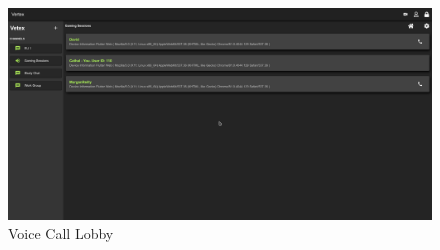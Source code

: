\begin{figure}[h!]
    \caption{Voice Call Lobby}
    \label{image:voiceCallLobby}
    \centering
    \includegraphics[width=1.0\textwidth]{images/voiceCallLobby.png}
\end{figure}

